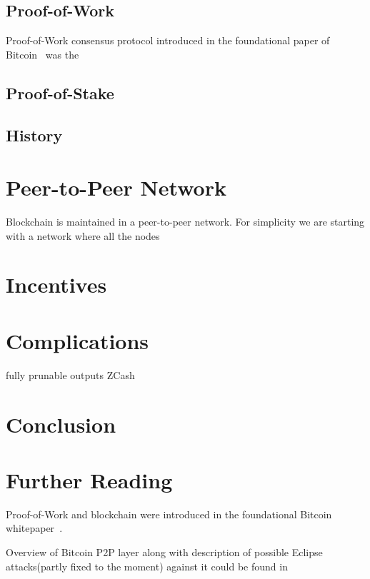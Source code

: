 \documentclass[]{report}   %
\begin{document}
\subsection{Proof-of-Work}

Proof-of-Work consensus protocol introduced in the foundational paper of Bitcoin~\cite{Nakamoto2008} was the 



\subsection{Proof-of-Stake}

\subsection{History}       %


\section{Peer-to-Peer Network}	

Blockchain is maintained in a peer-to-peer network. For simplicity we are starting with a network where all the nodes 

\section{Incentives}



\section{Complications}

fully prunable outputs 
ZCash

\section{Conclusion}


\section{Further Reading}

Proof-of-Work and blockchain were introduced in the foundational Bitcoin whitepaper~\cite{Nakamoto2008}.

Overview of Bitcoin P2P layer along with description of possible Eclipse attacks(partly fixed to the moment) against it could be found in~\cite{heilman2015eclipse}
\end{document}
